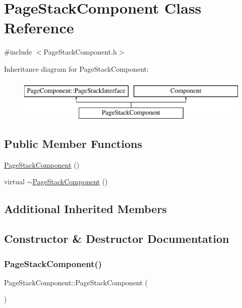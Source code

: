 \hypertarget{classPageStackComponent}{}\section{Page\+Stack\+Component Class Reference}
\label{classPageStackComponent}


{\ttfamily \#include $<$Page\+Stack\+Component.\+h$>$}

Inheritance diagram for Page\+Stack\+Component\+:\begin{figure}[H]
\begin{center}
\leavevmode
\includegraphics[height=2.000000cm]{classPageStackComponent}
\end{center}
\end{figure}
\subsection*{Public Member Functions}
\begin{DoxyCompactItemize}
\item 
\mbox{\hyperlink{classPageStackComponent_aff26293cc3b282d376157c2c692b6c03}{Page\+Stack\+Component}} ()
\item 
virtual \mbox{\hyperlink{classPageStackComponent_a4921a4cd4b1a7ab8b4f71037b4c7b6d4}{$\sim$\+Page\+Stack\+Component}} ()
\end{DoxyCompactItemize}
\subsection*{Additional Inherited Members}


\subsection{Constructor \& Destructor Documentation}
\mbox{\label{classPageStackComponent_aff26293cc3b282d376157c2c692b6c03}} 
\subsubsection{\texorpdfstring{Page\+Stack\+Component()}{PageStackComponent()}}
{\footnotesize\ttfamily Page\+Stack\+Component\+::\+Page\+Stack\+Component (\begin{DoxyParamCaption}{ }\end{DoxyParamCaption})}

